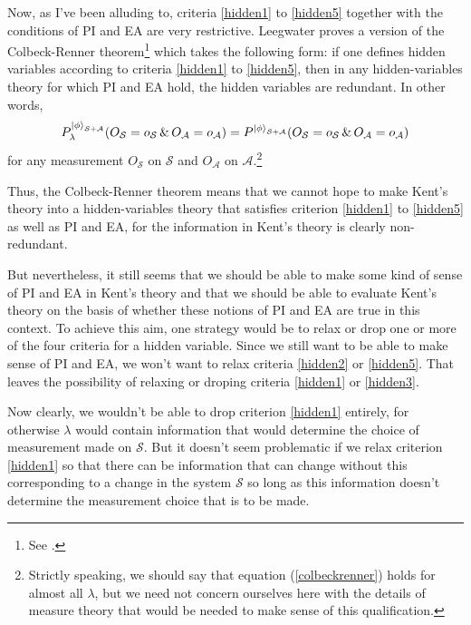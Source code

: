 Now, as I've been alluding to, criteria \ref{hidden1} to \ref{hidden5} together with the conditions of PI and EA are very restrictive. Leegwater proves a version of the Colbeck-Renner theorem\footnote{See \cite{LeegwaterGijs2016Aitf}.} which takes the following form: if one defines hidden variables according to criteria \ref{hidden1} to \ref{hidden5}, then in any hidden-variables theory for which PI and EA hold, the hidden variables are redundant. In other words, 
\begin{equation}\label{colbeckrenner}
P_\lambda^{\ket{\phi}_{\mathcal{S}+\mathcal{A}}}(O_\mathcal{S}=o_\mathcal{S}\, \& \,O_\mathcal{A}=o_\mathcal{A})=P^{\ket{\phi}_{\mathcal{S}+\mathcal{A}}}(O_\mathcal{S}=o_\mathcal{S}\, \& \,O_\mathcal{A}=o_\mathcal{A})
\end{equation}
for any measurement $O_\mathcal{S}$ on $\mathcal{S}$ and $O_\mathcal{A}$ on $\mathcal{A}$.\footnote{Strictly speaking, we should say that equation (\ref{colbeckrenner}) holds for almost all $\lambda$, but we need not concern ourselves here with the details of measure theory that would be needed to make sense of this qualification.} 

Thus, the Colbeck-Renner theorem means that we cannot hope to make Kent's theory into a hidden-variables theory that satisfies criterion \ref{hidden1} to \ref{hidden5} as well as  PI and EA, for the information in Kent's theory is clearly non-redundant.

But nevertheless, it still seems that we should be able to make some kind of sense of PI and EA in Kent's theory and that we should be able to evaluate Kent's theory on the basis of whether these notions of PI and EA are true in this context. To achieve this aim, one strategy would be to relax or drop one or more of the 
four criteria for a hidden variable. Since we still want to be able to make sense of PI and EA, we won't want to relax criteria \ref{hidden2} or \ref{hidden5}. That leaves the possibility of relaxing or droping criteria \ref{hidden1} or \ref{hidden3}. 

Now clearly, we wouldn't be able to drop criterion \ref{hidden1} entirely, for otherwise $\lambda$ would contain information that would determine the choice of measurement made on $\mathcal{S}$. But it doesn't seem problematic if we relax criterion \ref{hidden1} so that there can be information that can change without this corresponding to a change in the system $\mathcal{S}$ so long as this information doesn't determine the measurement choice that is to be made. 

